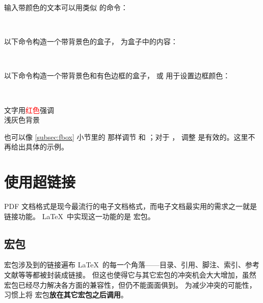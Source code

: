 输入带颜色的文本可以用类似  的命令：
\begin{command}
 \\
\end{command}

以下命令构造一个带背景色的盒子， 为盒子中的内容：
\begin{command}
 \\
\end{command}

以下命令构造一个带背景色和有色边框的盒子， 或  用于设置边框颜色：
\begin{command}
 \\
\end{command}

\begin{example}
\sffamily
文字用\textcolor{red}{红色}强调\\
\colorbox[gray]{0.95}{浅灰色背景} \\
\end{example}

 也可以像 \ref{subsec:fbox} 小节里的  那样调节  和 ；对于 ，
调整  是有效的。这里不再给出具体的示例。

\section{使用超链接}\label{sec:hyperlinks}

PDF 文档格式是现今最流行的电子文档格式，而电子文档最实用的需求之一就是链接功能。
\LaTeX\ 中实现这一功能的是  宏包。

\subsection{ 宏包}\label{subsec:hyperref}

 宏包涉及到的链接遍布 \LaTeX\ 的每一个角落——目录、引用、脚注、索引、参考文献等等都被封装成链接。
但这也使得它与其它宏包的冲突机会大大增加，虽然宏包已经尽力解决各方面的兼容性，但仍不能面面俱到。
为减少冲突的可能性，习惯上将  宏包\textbf{放在其它宏包之后调用}。

